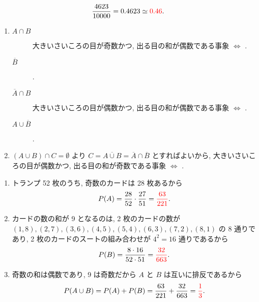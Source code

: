 \begin{align}
	\frac{4623}{10000} = 0.4623 \simeq \textcolor{red}{0.46}.
\end{align}

\begin{enumerate}
	\item{
		\begin{description}
			\item[$A \cap B$]{
				大きいさいころの目が奇数かつ, 出る目の和が偶数である事象 $\Leftrightarrow$ .
			}
			\item[$\overline{B}$]{
				.
			}
			\item[$\overline{A} \cap B$]{
				大きいさいころの目が偶数かつ, 出る目の和が偶数である事象 $\Leftrightarrow$ .
			}
			\item[$A \cup \overline{B}$]{
				.
			}
		\end{description}
	}
	\item{
		$(A \cup B) \cap C = \emptyset$ より $C = \overline{A \cup B} = \overline{A} \cap \overline{B}$ とすればよいから, 大きいさいころの目が偶数かつ, 出る目の和が奇数である事象 $\Leftrightarrow$ .
	}
\end{enumerate}

\begin{enumerate}
	\item{
		トランプ 52 枚のうち, 奇数のカードは 28 枚あるから
		\begin{align}
			P(A) = \frac{28}{52}\cdot\frac{27}{51} = \textcolor{red}{\frac{63}{221}}.
		\end{align}
	}
	\item{
		カードの数の和が 9 となるのは, 2 枚のカードの数が $(1, 8), (2, 7), (3, 6), (4, 5), (5, 4), (6, 3), (7, 2), (8, 1)$ の 8 通りであり, 2 枚のカードのスートの組み合わせが $4^{2} = 16$ 通りであるから
		\begin{align}
			P(B) = \frac{8\cdot16}{52\cdot51} = \textcolor{red}{\frac{32}{663}}.
		\end{align}
	}
	\item{
		奇数の和は偶数であり, 9 は奇数だから $A$ と $B$ は互いに排反であるから
		\begin{align}
			P(A\cup B) = P(A) + P(B) = \frac{63}{221} + \frac{32}{663} = \textcolor{red}{\frac{1}{3}}.
		\end{align}
	}
\end{enumerate}

